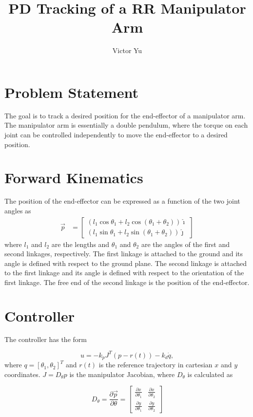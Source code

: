 \documentclass{article}
\title{PD Tracking of a RR Manipulator Arm}
\author{Victor Yu}
\begin{document}
	\maketitle
	
	\section{Problem Statement}
	The goal is to track a desired position for the end-effector of a manipulator arm. The manipulator arm is essentially a double pendulum, where the torque on each joint can be controlled independently to move the end-effector to a desired position.
	
	\section{Forward Kinematics}
	The position of the end-effector can be expressed as a function of the two joint angles as
	\begin{align}
	\vec{p} &= \begin{bmatrix}
	(l_1\cos{\theta_1} + l_2\cos{(\theta_1 + \theta_2)}) \hat{\imath} \\
	(l_1\sin{\theta_1} + l_2\sin{(\theta_1 + \theta_2)}) \hat{\jmath}
	\end{bmatrix}
	\end{align}
	where $l_1$ and $l_2$ are the lengths and $\theta_1$ and $\theta_2$ are the angles of the first and second linkages, respectively. The first linkage is attached to the ground and its angle is defined with respect to the ground plane. The second linkage is attached to the first linkage and its angle is defined with respect to the orientation of the first linkage. The free end of the second linkage is the position of the end-effector.
	
	\section{Controller}
	The controller has the form
	
	\begin{equation}
	u = -k_pJ^T(p-r(t))-k_d\dot{q},
	\end{equation}
	where $q = [\theta_1, \theta_2]^T$ and $r(t)$ is the reference trajectory in cartesian $x$ and $y$ coordinates. $J = D_{\theta}p$ is the manipulator Jacobian, where $D_{\theta}$ is calculated as
	
	\begin{equation}
	D_{\theta} = \frac{\partial \vec{p}}{\partial \theta} = 
	\begin{bmatrix}
	\frac{\partial x}{\partial \theta_1} & \frac{\partial x}{\partial \theta_2} \\
	\frac{\partial y}{\partial \theta_1} & \frac{\partial y}{\partial \theta_2}
	\end{bmatrix}
	\end{equation}
	
\end{document}
